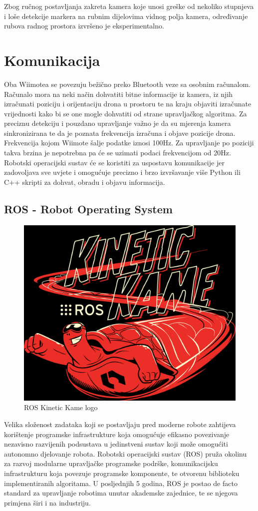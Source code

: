 \documentclass[times, utf8, diplomski]{fer}
\begin{document}
Zbog ručnog postavljanja zakreta kamera koje unosi greške od nekoliko stupnjeva i loše detekcije markera na rubnim dijelovima vidnog polja kamera, određivanje rubova radnog prostora izvršeno je eksperimentalno.  

\chapter{Komunikacija}
Oba Wiimotea se povezuju bežično preko Bluetooth veze sa osobnim računalom. Računalo mora na neki način dohvatiti bitne informacije iz kamera, iz njih izračunati poziciju i orijentaciju drona u prostoru te na kraju objaviti izračunate vrijednosti kako bi se one mogle dohvatiti od strane upravljačkog algoritma. Za preciznu detekciju i pouzdano upravljanje važno je da su mjerenja kamera sinkronizirana te da je poznata frekvencija izračuna i objave pozicije drona. Frekvencija kojom Wiimote šalje podatke iznosi 100Hz. Za upravljanje po poziciji takva brzina je nepotrebna pa će se uzimati podaci frekvencijom od 20Hz. Robotski operacijski sustav će se koristiti za uspostavu komunikacije jer zadovoljava sve uvjete i omogućuje precizno i brzo izvršavanje više Python ili C++ skripti za dohvat, obradu i objavu informacija.
 
\section{ROS - Robot Operating System}
\begin{figure}[h]
\centering
\includegraphics[width=.45\textwidth]{ros_kinetic}
\caption{ROS Kinetic Kame logo}
\label{fig:ros_kin}
\end{figure}
Velika složenost zadataka koji se postavljaju pred moderne robote zahtijeva korištenje programske infrastrukture koja omogućuje efikasno povezivanje nezavisno razvijenih podsustava u jedinstveni sustav koji može omogućiti autonomno djelovanje robota. Robotski operacijski sustav (ROS) pruža okolinu za razvoj modularne upravljačke programske podrške, komunikacijsku infrastrukturu koja povezuje programske komponente, te otvorenu biblioteku implementiranih algoritama. U posljednjih 5 godina, ROS je postao de facto standard za upravljanje robotima unutar akademske zajednice, te se njegova primjena širi i na industriju.
\end{document}
